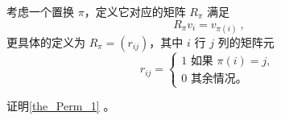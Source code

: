 考虑一个置换 $\pi$，定义它对应的矩阵 $R_\pi$ 满足
\begin{equation}
R_\pi v_i = v_{\pi(i)}~,
\end{equation}
更具体的定义为 $R_\pi = (r_{i j})$，其中 $i$ 行 $j$ 列的矩阵元
\begin{equation}
r_{i j} = \begin{cases}
1 \text{ 如果 } \pi(i) = j, \\
0 \text{ 其余情况。}~
\end{cases}~
\end{equation}

\begin{example}{}
证明\autoref{the_Perm_1} 。
\end{example}








